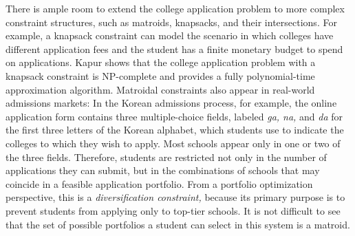 There is ample room to extend the college application problem to more complex constraint structures, such as matroids, knapsacks, and their intersections. For example, a knapsack constraint can model the scenario in which colleges have different application fees and the student has a finite monetary budget to spend on applications. Kapur \cite{kapur2022} shows that the college application problem with a knapsack constraint is NP-complete and provides a fully polynomial-time approximation algorithm. Matroidal constraints also appear in real-world admissions markets: In the Korean admissions process, for example, the online application form contains three multiple-choice fields, labeled \emph{ga, na,} and \emph{da} for the first three letters of the Korean alphabet, which students use to indicate the colleges to which they wish to apply. Most schools appear only in one or two of the three fields. Therefore, students are restricted not only in the number of applications they can submit, but in the combinations of schools that may coincide in a feasible application portfolio. From a portfolio optimization perspective, this is a \emph{diversification constraint,} because its primary purpose is to prevent students from applying only to top-tier schools. It is not difficult to see that the set of possible portfolios a student can select in this system is a matroid.




